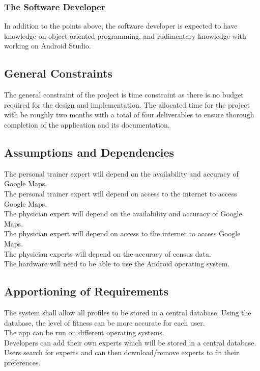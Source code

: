 \documentclass[12pt,letterpaper]{article}
\begin{document}
\subsubsection{The Software Developer}
\indent In addition to the points above, the software developer is expected to have knowledge on object oriented programming, and rudimentary knowledge with working on Android Studio.

\subsection{General Constraints}
The general constraint of the project is time constraint as there is no budget required for the design and implementation. The allocated time for the project with be roughly two months with a total of four deliverables to ensure thorough completion of the application and its documentation.

\subsection{Assumptions and Dependencies}
The personal trainer expert will depend on the availability and accuracy of Google Maps.\\
The personal trainer expert will depend on access to the internet to access Google Maps.\\
The physician expert will depend on the availability and accuracy of Google Maps.\\ 
The physician expert will depend on access to the internet to access Google Maps.\\
The physician experts will depend on the accuracy of census data.\\
The hardware will need to be able to use the Android operating system.

\subsection{Apportioning of Requirements}
The system shall allow all profiles to be stored in a central database.  Using the database, the level of fitness can be more accurate for each user.\\
The app can be run on different operating systems.\\
Developers can add their own experts which will be stored in a central database.  Users search for experts and can then download/remove experts to fit their preferences.
\end{document}
